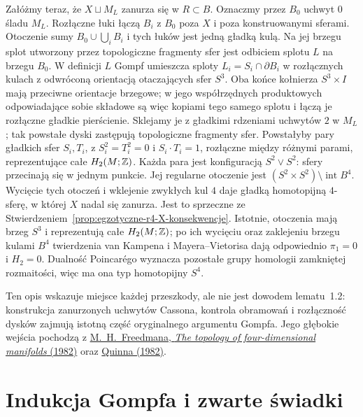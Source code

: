 \begin{uwaga}
Załóżmy teraz, że $X\sqcup M_L$ zanurza się
w $R\subset B$. Oznaczmy przez $B_0$ uchwyt $0$
śladu $M_L$. Rozłączne łuki łączą $B_i$ z $B_0$
poza $X$ i poza konstruowanymi sferami. Otoczenie
sumy $B_0\cup\bigcup_i B_i$ i tych łuków jest
jedną gładką kulą. Na jej brzegu splot utworzony
przez topologiczne fragmenty sfer jest odbiciem
splotu $L$ na brzegu $B_0$. W definicji $L$
Gompf umieszcza sploty $L_i=S_i\cap\partial B_i$
w rozłącznych kulach z odwróconą orientacją
otaczających sfer $S^3$. Oba końce kołnierza
$S^3\times I$ mają przeciwne orientacje brzegowe;
w jego współrzędnych produktowych odpowiadające
sobie składowe są więc kopiami tego samego splotu
i łączą je rozłączne gładkie pierścienie. Sklejamy je
z gładkimi rdzeniami uchwytów $2$ w $M_L$;
tak powstałe dyski zastępują topologiczne fragmenty
sfer. Powstałyby pary gładkich
sfer $S_i,T_i$, z
$S_i^2=T_i^2=0$ i $S_i\cdot T_i=1$,
rozłączne między różnymi parami, reprezentujące
całe $H_2(M;\mathbb{Z})$. Każda para jest konfiguracją
$S^2\vee S^2$: sfery przecinają się w jednym
punkcie. Jej regularne otoczenie jest
$(S^2\times S^2)\setminus\operatorname{int}B^4$.
Wycięcie tych otoczeń i wklejenie zwykłych
kul $4$ daje gładką homotopijną $4$-sferę,
w której $X$ nadal się zanurza. Jest to sprzeczne
ze Stwierdzeniem~\ref{prop:egzotyczne-r4-X-konsekwencje}.
Istotnie, otoczenia mają brzeg $S^3$ i
reprezentują całe $H_2(M;\mathbb{Z})$; po ich wycięciu
oraz zaklejeniu brzegu kulami $B^4$ twierdzenia
van Kampena i Mayera--Vietorisa dają odpowiednio
$\pi_1=0$ i $H_2=0$. Dualność Poincarégo
wyznacza pozostałe grupy homologii zamkniętej
rozmaitości, więc ma ona typ homotopijny $S^4$.

Ten opis wskazuje miejsce każdej przeszkody,
ale nie jest dowodem lematu~1.2: konstrukcja
zanurzonych uchwytów Cassona, kontrola obramowań
i rozłączność dysków zajmują istotną część
oryginalnego argumentu Gompfa. Jego głębokie
wejścia pochodzą z
\href{https://www.maths.gla.ac.uk/~mpowell/1982_The%20topology%20of%20four-dimensional%20manifolds.pdf}
{M.~H.~Freedmana, \emph{The topology of
four-dimensional manifolds} (1982)} oraz
\href{https://www.maths.gla.ac.uk/~mpowell/1982_Ends%20of%20maps%20III.pdf}
{Quinna (1982)}.
\end{uwaga}

\section{Indukcja Gompfa i zwarte świadki}
\label{sec:egzotyczne-r4-indukcja}

